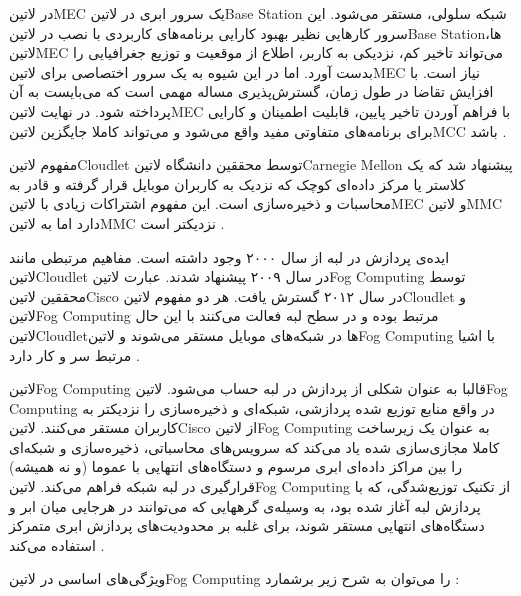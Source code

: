 در ‌لاتین{MEC} یک سرور ابری در ‌لاتین{Base Station} شبکه سلولی، مستقر می‌شود. این سرور کارهایی نظیر بهبود کارایی برنامه‌های کاربردی
با نصب در ‌لاتین{Base Station}ها، ‌لاتین{MEC} می‌تواند تاخیر کم، نزدیکی به کاربر، اطلاع از موقعیت و توزیع جغرافیایی را بدست آورد.
اما در این شیوه به یک سرور اختصاصی برای ‌لاتین{MEC} نیاز است.
با افزایش تقاضا در طول زمان، گسترش‌پذیری مساله مهمی است که می‌بایست به آن پرداخته شود.
در نهایت ‌لاتین{MEC} با فراهم آوردن تاخیر پایین، قابلیت اطمینان و کارایی برای برنامه‌های متفاوتی مفید واقع می‌شود و می‌تواند کاملا جایگزین ‌لاتین{MCC} باشد
.


مفهوم ‌لاتین{Cloudlet} توسط محققین دانشگاه ‌لاتین{Carnegie Mellon} پیشنهاد شد که یک کلاستر یا مرکز داده‌ای کوچک
که نزدیک به کاربران موبایل قرار گرفته و قادر به محاسبات و ذخیره‌سازی است.
این مفهوم اشتراکات زیادی با ‌لاتین{MEC} و ‌لاتین{MMC} دارد اما به ‌لاتین{MMC} نزدیکتر است
.


ایده‌ی پردازش در لبه از سال ۲۰۰۰ وجود داشته است. مفاهیم مرتبطی مانند ‌لاتین{Cloudlet} در سال ۲۰۰۹ پیشنهاد شدند.
عبارت ‌لاتین{Fog Computing} توسط محققین ‌لاتین{Cisco} در سال ۲۰۱۲ گسترش یافت.
هر دو مفهوم ‌لاتین{Cloudlet} و ‌لاتین{Fog Computing} مرتبط بوده و در سطح لبه فعالت می‌کنند با این حال
‌لاتین{Cloudlet}ها در شبکه‌های موبایل مستقر می‌شوند و ‌لاتین{Fog Computing} با اشیا مرتبط سر و کار دارد
.

‌لاتین{Fog Computing} قالبا به عنوان شکلی از پردازش در لبه حساب می‌شود.
‌لاتین{Fog Computing} در واقع منابع توزیع شده پردازشی، شبکه‌ای و ذخیره‌سازی را نزدیکتر به کاربران مستقر می‌کنند.
‌لاتین{Cisco} از ‌لاتین{Fog Computing} به عنوان یک زیرساخت کاملا مجازی‌سازی شده یاد می‌کند که سرویس‌های محاسباتی، ذخیره‌سازی و شبکه‌ای
را بین مراکز داده‌ای ابری مرسوم و دستگاه‌های انتهایی با عموما (و نه همیشه) قرارگیری در لبه شبکه فراهم می‌کند.
‌لاتین{Fog Computing} از تکنیک توزیع‌شدگی، که با پردازش لبه آغاز شده بود، به وسیله‌ی گرههایی که
می‌توانند در هرجایی میان ابر و دستگاه‌های انتهایی مستقر شوند،
برای غلبه بر محدودیت‌های پردازش ابری متمرکز استفاده می‌کند
.


ویژگی‌های اساسی در ‌لاتین{Fog Computing} را می‌توان به شرح زیر برشمارد
:

